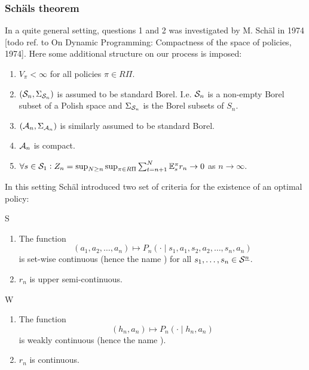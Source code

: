 \subsubsection{Schäls theorem}
In a quite general setting, questions 1 and 2
was investigated by M. Schäl in 1974
[todo ref. to On Dynamic Programming:
Compactness of the space of policies, 1974].
Here some additional structure on our process is imposed:
\begin{sett}[Schäl]
  \begin{enumerate}
    \item $V_\pi < \infty$ for all policies $\pi \in R\Pi$.
    \item $(\mathcal{S}_n, \Sigma_{\mathcal{S}_n})$ is assumed to be standard Borel.
      I.e. $\mathcal{S}_n$ is a non-empty Borel subset of a Polish space
      and $\Sigma_{\mathcal{S}_n}$ is the Borel subsets of $S_n$.
    \item $(\mathcal{A}_n, \Sigma_{\mathcal{A}_n})$ is similarly assumed to be
      standard Borel.
    \item $\mathcal{A}_n$ is compact.
    \item $\forall s \in \mathcal{S}_1 :
      Z_n = \sup_{N \geq n} \sup_{\pi \in R\Pi} \sum_{t=n+1}^N
      \mathbb{E}_s^\pi r_n \to 0$ as $n \to \infty$.
  \end{enumerate}
  \label{sett:Schal}
\end{sett}

In this setting Schäl introduced two set of criteria for the existence
of an optimal policy:

\begin{cond}{S}
  \begin{enumerate}
    \item The function \[
	(a_1, a_2, \dots, a_n) \mapsto
	P_n(\cdot \mid s_1, a_1, s_2, a_2, \dots, s_n, a_n)
      \]
      is set-wise continuous (hence the name )
      for all $s_1, \dots, s_n \in \mathcal{S}^{\underline{n}}$.
    \item $r_n$ is upper semi-continuous.
  \end{enumerate}
  \label{cond:S}
\end{cond}

\begin{cond}{W}
  \begin{enumerate}
    \item The function
      \[(h_n, a_n) \mapsto P_n(\cdot \mid h_n, a_n)\]
	is weakly continuous (hence the name ).
    \item $r_n$ is continuous.
  \end{enumerate}
  \label{cond:W}
\end{cond}

